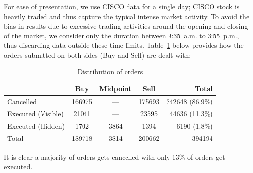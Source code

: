 For ease of presentation, we use CISCO data for a single day; CISCO stock is heavily traded and thus capture the typical intense market activity. To avoid the bias in results due to excessive trading activities around the opening and closing of the market, we consider only the duration between 9:35~a.m. to 3:55~p.m., thus discarding data outside these time limits. Table~\ref{tab:distributionoforder} below provides how the orders submitted on both sides (Buy and Sell) are dealt with:
	\begin{table}[!ht]
	\centering
	\caption{Distribution of orders \label{tab:distributionoforder}}
	\begin{tabular}{l | ccc | r}
	& Buy & Midpoint & Sell & Total \\ \hline
	Cancelled & 166975 & --- & 175693 & 342648 (86.9\%) \\
	Executed (Visible) & 21041 & --- & 23595 & 44636 (11.3\%) \\
	Executed (Hidden) & 1702 & 3864 & 1394 & 6190 (1.8\%) \\ \hline
	Total & 189718 & 3814 & 200662 & 394194
	\end{tabular}
	\end{table}
It is clear a majority of orders gets cancelled with only 13\% of orders get executed. 


